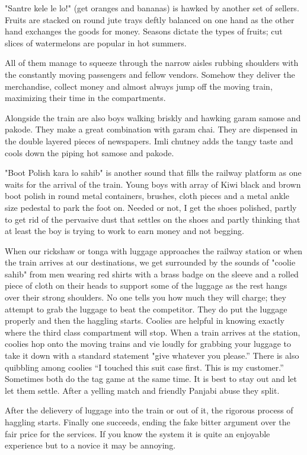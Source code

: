 "Santre kele le lo!" (get oranges and bananas) is hawked by another set of
sellers. Fruits are stacked on round jute trays deftly balanced on one
hand as the other hand exchanges the goods for money. Seasons dictate the
types of fruits; cut slices of watermelons are popular in hot summers. 

All of them manage to squeeze through the narrow aisles rubbing shoulders
with  the constantly moving passengers and fellow vendors. Somehow they
deliver the merchandise, collect money and almost always jump off the
moving train, maximizing their time in the compartments. 

Alongside the train are also boys walking briskly and hawking garam samose
and pakode. They make a great combination with garam chai. They are
dispensed in the double layered pieces of newspapers. Imli chutney adds
the tangy taste and cools down the piping hot samose and pakode. 

"Boot Polish kara lo sahib" is another sound that fills the railway
platform as one waits for the arrival of the train. Young boys with array
of Kiwi black and brown boot polish in round metal containers, brushes,
cloth pieces and a metal ankle size pedestal to park the foot on. Needed
or not, I get the shoes polished, partly to get rid of the pervasive dust
that settles on the shoes and partly thinking that at least the boy is
trying to work to earn money and not begging. 

When our rickshaw or tonga with luggage approaches the railway station or
when the train arrives at our destinations, we get surrounded by the
sounds of "coolie sahib" from men wearing red shirts with a brass badge on
the sleeve and a rolled piece of cloth on their heads to support some of
the luggage as the rest hangs over their strong shoulders. No one tells
you how much they will charge; they attempt to grab the luggage to beat
the competitor. They do put the luggage properly and then the haggling
starts. Coolies are helpful in knowing exactly where the third class
compartment will stop. When a train arrives at the station, coolies hop
onto the moving trains and vie loudly for grabbing your luggage to take it
down with a standard statement "give whatever you please.” There is also
quibbling among coolies “I touched this suit case first. This is my
customer.” Sometimes both do the tag game at the same time. It is best to
stay out and let let them settle. After a yelling match and friendly
Panjabi abuse they split. 

After the delievery of luggage into the train or out of it, the rigorous
process of haggling starts. Finally one succeeds, ending the fake bitter
argument over the fair price for the services.  If you know the system it
is quite an enjoyable experience but to a novice it may be annoying. 

